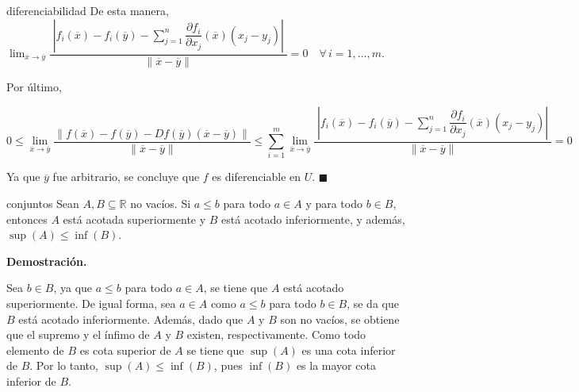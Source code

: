 \documentclass[fleqn, 12pt]{article}
\newenvironment{ejercicio}[1]{\begin{ejer}[breakable, pad at break = 5mm, leftrule = 0.7mm, rightrule = 0.7mm, right = 2mm, left = 2mm, enlarge bottom finally by = 3mm]{}{#1}}{\end{ejer}}
\begin{document}
\begin{ejercicio}{diferenciabilidad}
		De esta manera, $ \displaystyle \lim_{\overline{x} \to \overline{y}} \dfrac{ \phantom{|} \left\lvert f_i(\overline{x}) - f_i(\overline{y}) - \displaystyle \sum_{j=1}^{n} \dfrac{\partial f_i}{\partial x_j} (\overline{x}) \left( x_j - y_j \right) \right\rvert \phantom{|}}{ \left\lVert \overline{x} - \overline{y} \right\rVert } = 0 \quad \forall \, i = 1, \ldots, m $. \bigskip

		Por último, 

		\begin{equation*}
			0 \leq \lim_{\overline{x} \to \overline{y}} \dfrac{ \left\lVert f(\overline{x}) - f(\overline{y}) - Df(\overline{y}) \left( \overline{x} - \overline{y} \right) \right\rVert }{ \left\lVert \overline{x} - \overline{y} \right\rVert } \leq \sum_{i=1}^{m} \lim_{\overline{x} \to \overline{y}} \dfrac{ \phantom{|} \left\lvert f_i(\overline{x}) - f_i(\overline{y}) - \displaystyle \sum_{j=1}^{n} \dfrac{\partial f_i}{\partial x_j} (\overline{x}) \left( x_j - y_j \right) \right\rvert \phantom{|}}{ \left\lVert \overline{x} - \overline{y} \right\rVert } = 0
		\end{equation*}

		Ya que $ \overline{y} $ fue arbitrario, se concluye que $ f $ es diferenciable en $ U $. \hfill $ \blacksquare $
	\end{ejercicio}


	\begin{ejercicio}{conjuntos}
		Sean $ A, B \subseteq \mathbb{R} $ no vacíos. Si $ a \leq b $ para todo $ a \in A $ y para todo $ b \in B $, entonces $ A $ está acotada superiormente y $ B $ está acotado inferiormente, y además, $ \sup (A) \leq \inf (B) $.

		\tcblower
		
		\textbf{Demostración.} \medskip

		Sea $ b \in B $, ya que $ a \leq b $ para todo $ a \in A $, se tiene que $ A $ está acotado superiormente. De igual forma, sea $ a \in A $ como $ a \leq b $ para todo $ b \in B $, se da que $ B $ está acotado inferiormente. Además, dado que $ A $ y $ B $ son no vacíos, se obtiene que el supremo y el ínfimo de $ A $ y $ B $ existen, respectivamente. Como todo elemento de $ B $ es cota superior de $ A $ se tiene que $ \sup (A) $ es una cota inferior de $ B $. Por lo tanto, $ \sup (A) \leq \inf (B) $, pues $ \inf(B) $ es la mayor cota inferior de $ B $.
	\end{ejercicio}
	
\end{document}
